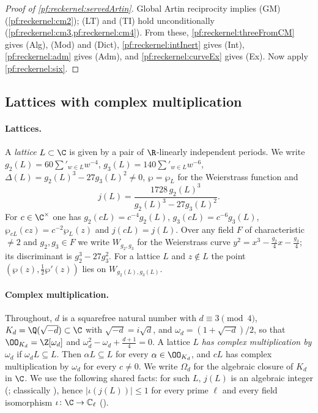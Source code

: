 \begin{proof}[Proof of \cref{pf:reckernel:servedArtin}]
Global Artin reciprocity implies (GM) (\cref{pf:reckernel:cm2}); (LT) and (TI) hold unconditionally
(\cref{pf:reckernel:cm3,pf:reckernel:cm4}). From these, \cref{pf:reckernel:threeFromCM} gives (Alg), (Mod) and (Dict),
\cref{pf:reckernel:intInert} gives (Int), \cref{pf:reckernel:adm} gives (Adm), and \cref{pf:reckernel:curveEx} gives
(Ex). Now apply \cref{pf:reckernel:six}.
\end{proof}

\subsection{Lattices with complex multiplication}\label{pf:reckernel:sec-cmdefs}

\paragraph{Lattices.}
A \emph{lattice} $L\subset\C$ is given by a pair of $\R$-linearly independent periods. We write
$g_2(L)=60\sum'_{w\in L}w^{-4}$, $g_3(L)=140\sum'_{w\in L}w^{-6}$, $\Delta(L)=g_2(L)^3-27g_3(L)^2\ne0$,
$\wp=\wp_L$ for the Weierstrass function and
\[
j(L)=\frac{1728\,g_2(L)^3}{g_2(L)^3-27g_3(L)^2}.
\]
For $c\in\C^\times$ one has $g_2(cL)=c^{-4}g_2(L)$, $g_3(cL)=c^{-6}g_3(L)$, $\wp_{cL}(cz)=c^{-2}\wp_L(z)$ and
$j(cL)=j(L)$. Over any field $F$ of characteristic $\ne2$ and $g_2,g_3\in F$ we write $W_{g_2,g_3}$ for the
Weierstrass curve $y^2=x^3-\tfrac{g_2}{4}x-\tfrac{g_3}{4}$; its discriminant is $g_2^3-27g_3^2$. For a lattice
$L$ and $z\notin L$ the point $(\wp(z),\tfrac12\wp'(z))$ lies on $W_{g_2(L),g_3(L)}$.

\paragraph{Complex multiplication.}
Throughout, $d$ is a squarefree natural number with $d\equiv3\pmod 4$, $K_d=\Q(\sqrt{-d})\subset\C$ with
$\sqrt{-d}=i\sqrt d$, and $\omega_d=(1+\sqrt{-d})/2$, so that $\OO_{K_d}=\Z[\omega_d]$ and
$\omega_d^2-\omega_d+\tfrac{d+1}{4}=0$. A lattice $L$ \emph{has complex multiplication by $\omega_d$} if
$\omega_dL\subseteq L$. Then $\alpha L\subseteq L$ for every $\alpha\in\OO_{K_d}$, and $cL$ has complex
multiplication by $\omega_d$ for every $c\ne0$. We write $\Omega_d$ for the algebraic closure of $K_d$ in $\C$.
We use the following shared facts: for such $L$, $j(L)$ is an algebraic integer
(; classically \cite[Ch.~II, \S6]{Silverman1994}), hence
$|\iota(j(L))|\le1$ for every prime $\ell$ and every field isomorphism $\iota\colon\C\to\reckCl$
().

